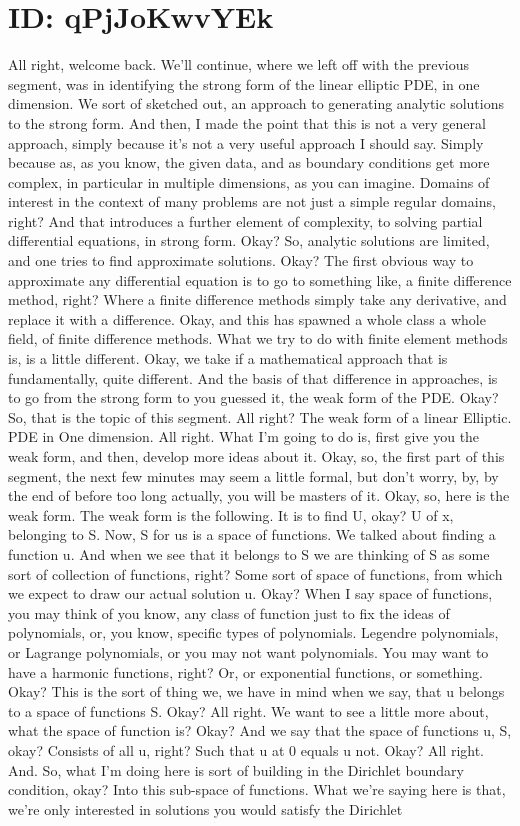 \documentclass[10pt]{article}
\begin{document}
\section*{ID: qPjJoKwvYEk}
All right, welcome back. We'll continue, where we left off with the previous segment, was in identifying the strong form of the linear elliptic PDE, in one dimension. We sort of sketched out, an approach to generating analytic solutions to the strong form. And then, I made the point that this is not a very general approach, simply because it's not a very useful approach I should say. Simply because as, as you know, the given data, and as boundary conditions get more complex, in particular in multiple dimensions, as you can imagine. Domains of interest in the context of many problems are not just a simple regular domains, right? And that introduces a further element of complexity, to solving partial differential equations, in strong form. Okay? So, analytic solutions are limited, and one tries to find approximate solutions. Okay? The first obvious way to approximate any differential equation is to go to something like, a finite difference method, right? Where a finite difference methods simply take any derivative, and replace it with a difference. Okay, and this has spawned a whole class a whole field, of finite difference methods. What we try to do with finite element methods is, is a little different. Okay, we take if a mathematical approach that is fundamentally, quite different. And the basis of that difference in approaches, is to go from the strong form to you guessed it, the weak form of the PDE. Okay? So, that is the topic of this segment. All right? The weak form of a linear Elliptic. PDE in One dimension. All right. What I'm going to do is, first give you the weak form, and then, develop more ideas about it. Okay, so, the first part of this segment, the next few minutes may seem a little formal, but don't worry, by, by the end of before too long actually, you will be masters of it. Okay, so, here is the weak form. The weak form is the following. It is to find U, okay? U of x, belonging to S. Now, S for us is a space of functions. We talked about finding a function u. And when we see that it belongs to S we are thinking of S as some sort of collection of functions, right? Some sort of space of functions, from which we expect to draw our actual solution u. Okay? When I say space of functions, you may think of you know, any class of function just to fix the ideas of polynomials, or, you know, specific types of polynomials. Legendre polynomials, or Lagrange polynomials, or you may not want polynomials. You may want to have a harmonic functions, right? Or, or exponential functions, or something. Okay? This is the sort of thing we, we have in mind when we say, that u belongs to a space of functions S. Okay? All right. We want to see a little more about, what the space of function is? Okay? And we say that the space of functions u,  S, okay? Consists of all u, right? Such that u at 0 equals u not. Okay? All right. And. So, what I'm doing here is sort of building in the Dirichlet boundary condition, okay? Into this sub-space of functions. What we're saying here is that, we're only interested in solutions you would satisfy the Dirichlet 
\end{document}

